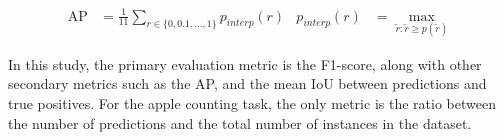 \begin{align}
  \text{AP} &= \frac{1}{11}\sum_{r\in\{0,0.1,...,1\}}p_{interp}(r)	&	p_{interp}(r) &= \max_{\tilde{r}:\tilde{r}\geq p(\tilde{r})}
\end{align} 

In this study, the primary evaluation metric is the F1-score, along with other secondary metrics such as the AP, and the mean IoU between predictions and true positives. For the apple counting task, the only metric is the ratio between the number of predictions and the total number of instances in the dataset.